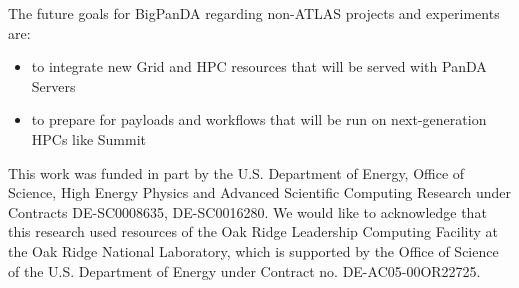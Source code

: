 \documentclass{webofc}
\begin{document}
The future goals for BigPanDA regarding non-ATLAS projects and experiments are:

\begin{itemize}
	\item to integrate new Grid and HPC resources that will be served with PanDA Servers
	\item to prepare for payloads and workflows that will be run on next-generation HPCs like Summit
\end{itemize}

\bigskip



\begin{acknowledgement}
	This work was funded in part by the U.S. Department of Energy, Office of Science, High Energy Physics and Advanced Scientific Computing Research under Contracts DE-SC0008635, DE-SC0016280. We would like to acknowledge that this research used resources of the Oak Ridge Leadership Computing Facility at the Oak Ridge National Laboratory, which is supported by the Office of Science of the U.S. Department of Energy under Contract no. DE-AC05-00OR22725.
\end{acknowledgement}


%

\end{document}
